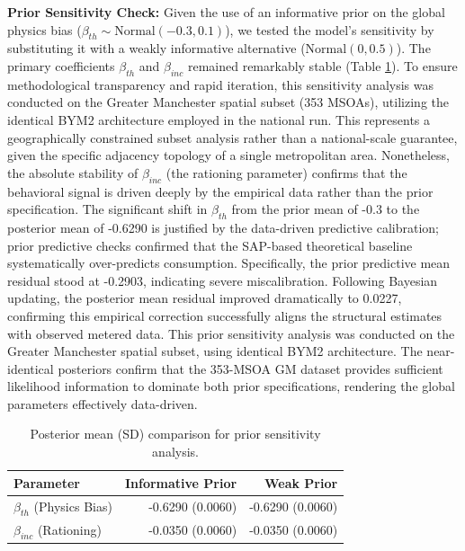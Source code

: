 \documentclass[11pt, a4paper, twocolumn, numbers]{elsarticle}
\begin{document}
\textbf{Prior Sensitivity Check:} Given the use of an informative prior 
on the global physics bias
(\(\beta_{th} \sim \text{Normal}(-0.3, 0.1)\)), we tested the model's 
sensitivity by substituting it with a weakly informative alternative 
(\(\text{Normal}(0, 0.5)\)). The primary
coefficients \(\beta_{th}\) and \(\beta_{inc}\) remained remarkably 
stable (Table \ref{tab:prior_sensitivity}). To ensure methodological transparency and rapid iteration, this sensitivity analysis was conducted on the Greater Manchester spatial subset (353 MSOAs), utilizing the identical BYM2 architecture employed in the national run. This represents a geographically constrained subset analysis rather than a national-scale guarantee, given the specific adjacency topology of a single metropolitan area. Nonetheless, the absolute stability of \(\beta_{inc}\) (the rationing parameter) 
confirms that the behavioral signal is driven deeply by the empirical data rather than 
the prior specification. The significant shift in \(\beta_{th}\) from the 
prior mean of -0.3 to the posterior mean of -0.6290 
is justified by the data-driven predictive calibration; prior predictive 
checks confirmed that the SAP-based theoretical baseline systematically 
over-predicts consumption. Specifically, the prior predictive mean residual 
stood at -0.2903, indicating severe miscalibration. Following Bayesian 
updating, the posterior mean residual improved dramatically to 0.0227, 
confirming this empirical correction successfully aligns the structural estimates 
with observed metered data. This prior sensitivity analysis was conducted on the Greater Manchester spatial subset, using identical BYM2 architecture. The near-identical posteriors confirm that the 353-MSOA GM dataset provides sufficient likelihood information to dominate both prior specifications, rendering the global parameters effectively data-driven.

\begin{table}[t]
\centering
\normalsize
\begin{tabular}{lrr}
\toprule
Parameter & Informative Prior & Weak Prior \\
\midrule
$\beta_{th}$ (Physics Bias) & -0.6290 (0.0060) & -0.6290 (0.0060) \\
$\beta_{inc}$ (Rationing) & -0.0350 (0.0060) & -0.0350 (0.0060) \\
\bottomrule
\end{tabular}
\caption{Posterior mean (SD) comparison for prior sensitivity analysis.}
\label{tab:prior_sensitivity}
\end{table}
\end{document}
